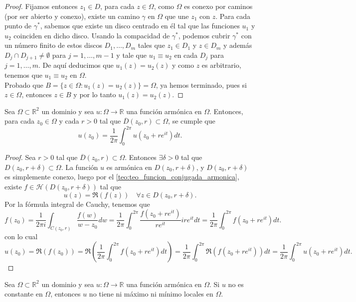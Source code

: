 \begin{proof}
    Fijamos entonces $z_1 \in D$, para cada $z \in \Omega$, como $\Omega$ es conexo por caminos (por ser abierto y conexo), existe un camino $\gamma$ en $\Omega$ que une $z_1$ con $z$. Para cada punto de $\gamma^*$, sabemos que existe un disco centrado en él tal que las funciones $u_1$ y $u_2$ coinciden en dicho disco. Usando la compacidad de $\gamma^*$, podemos cubrir $\gamma^*$ con un número finito de estos discos $D_1, \ldots, D_m$ tales que $z_1 \in D_1$ y $z \in D_m$ y además $D_j \cap D_{j+1} \neq \emptyset$ para $j = 1, \ldots, m-1$ y tale que $u_1 \equiv u_2$ en cada $D_j$ para $j = 1, \ldots, m$. De aquí deducimos que $u_1(z) = u_2(z)$ y como $z$ es arbitrario, tenemos que $u_1 \equiv u_2$ en $\Omega$.\\
    Probado que $B = \{z \in \Omega : u_1(z) = u_2(z)\} = \Omega$, ya hemos terminado, pues si $z \in \Omega$, entonces $z \in B$ y por lo tanto $u_1(z) = u_2(z)$.
\end{proof}

\begin{teorema} 
    Sea $\Omega \subset \mathbb{R}^2$ un dominio y sea $u:\Omega \to \mathbb{R}$ una función armónica en $\Omega$. Entonces, para cada $z_0 \in \Omega$ y cada $r > 0$ tal que $\overline{D}(z_0,r) \subset \Omega$, se cumple que
    \[
        u(z_0) = \frac{1}{2\pi} \int_0^{2\pi} u(z_0 + re^{it}) dt.
    \]
\end{teorema}

\begin{proof}
    Sea $r > 0$ tal que $\overline{D}(z_0,r) \subset \Omega$. Entonces $\exists \delta > 0$ tal que $D(z_0,r + \delta) \subset \Omega$. La función $u$ es armónica en $D(z_0,r + \delta)$, y $D(z_0,r + \delta)$ es simplemente conexo, luego por el \cref{teo:teo_funcion_conjugada_armonica}, existe $f \in \mathcal{H}(D(z_0,r + \delta))$ tal que
    \[
        u(z) = \Re(f(z)) \quad \forall z \in D(z_0,r + \delta).
    \]
    Por la fórmula integral de Cauchy, tenemos que
    \[
        f(z_0) = \frac{1}{2\pi i} \int_{C(z_0,r)} \frac{f(w)}{w - z_0} dw = \frac{1}{2\pi} \int_0^{2\pi} \frac{f(z_0 + re^{it})}{re^{it}} ire^{it} dt = \frac{1}{2\pi} \int_0^{2\pi} f(z_0 + re^{it}) dt.
    \]
    con lo cual
    \[
        u(z_0) = \Re(f(z_0)) = \Re\left(\frac{1}{2\pi} \int_0^{2\pi} f(z_0 + re^{it}) dt\right) = \frac{1}{2\pi} \int_0^{2\pi} \Re(f(z_0 + re^{it})) dt = \frac{1}{2\pi} \int_0^{2\pi} u(z_0 + re^{it}) dt.
    \]
\end{proof}

\begin{teorema} 
    Sea $\Omega \subset \mathbb{R}^2$ un dominio y sea $u:\Omega \to \mathbb{R}$ una función armónica en $\Omega$. Si $u$ no es constante en $\Omega$, entonces $u$ no tiene ni máximo ni mínimo locales en $\Omega$.
\end{teorema}

